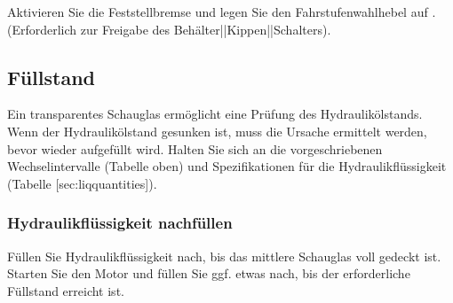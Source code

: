 \stopsection



\item Aktivieren Sie die Feststellbremse und legen Sie den Fahrstufenwahlhebel auf . (Erforderlich zur Freigabe des Behälter||Kippen||Schalters).



\subsection[niveau_hydrau]{Füllstand}

Ein transparentes
Schauglas
ermöglicht eine Prüfung des Hydraulikölstands.
Wenn der Hydraulikölstand gesunken ist, muss die Ursache
ermittelt werden, bevor wieder aufgefüllt wird. Halten Sie sich an die
vorgeschriebenen Wechselintervalle (Tabelle oben) und Spezifikationen für die
Hydraulikflüssigkeit (Tabelle [sec:liqquantities]).


\subsubsection{Hydraulikflüssigkeit nachfüllen}

Füllen Sie Hydraulikflüssigkeit nach, bis das mittlere Schauglas voll gedeckt ist.
Starten Sie den Motor und füllen Sie ggf. etwas nach, bis der erforderliche
Füllstand erreicht ist.
